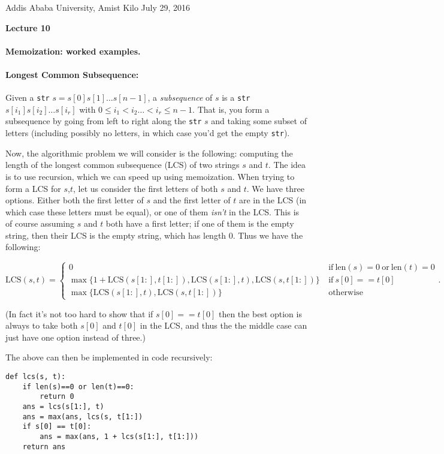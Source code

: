 \documentclass[11pt]{article}
\newlength{\toppush}
\newcommand{\htitle}[2]{\noindent\vspace*{-\toppush}\newline\parbox{6.5in}
 {\large Addis Ababa University, Amist Kilo \hfill #1\newline
\hspace*{\fill}{\bf Algorithms and Programming for High Schoolers} \hspace*{\fill} \newline
\mbox{}\hrulefill\mbox{}}\vspace*{1ex}\mbox{}\newline
\begin{center}{\Large\bf #2}\end{center}}
\begin{document}
\htitle{July 29, 2016}{Lecture 10}

\paragraph{\Large Memoization: worked examples.}

\paragraph{Longest Common Subsequence:}
Given a \texttt{str} $s = s[0]s[1]\ldots s[n-1]$, a {\em subsequence}
of $s$ is a \texttt{str} $s[i_1]s[i_2]\ldots s[i_r]$ with $0 \le i_1 <
i_2 \ldots < i_r \le n-1$. That is, you form a subsequence by going
from left to right along the \texttt{str} $s$ and taking some subset
of letters (including possibly no letters, in which case you'd get the
empty \texttt{str}).

Now, the algorithmic problem we will consider is the following:
computing the length of the longest common subsequence (LCS) of two
strings
$s$ and $t$.  The idea is to use recursion, which we can speed up
using memoization.  When trying to form a LCS
for $s$,$t$, let us consider the first letters of both $s$ and $t$.
We have three options.  Either both the first letter of $s$ and the
first letter of $t$ are in the LCS (in which
case these letters must be equal), or one of them {\em isn't
} in the LCS.  This is of course assuming $s$ and $t$ both have a
first letter; if one of them is the empty string, then their LCS is
the empty string, which has length $0$.  Thus we have the following:

$$\mathrm{LCS}(s,t) =\begin{cases} 0 \ &
  \mathrm{if}\ \mathrm{len}(s)=0\ \mathrm{or}\ \mathrm{len}(t) = 0
\\ \max\{1 + \mathrm{LCS}(s[1:],t[1:]), \mathrm{LCS}(s[1:],t),
\mathrm{LCS}(s,t[1:])\} \ & \mathrm{if}\ s[0] == t[0]\\
\max\{\mathrm{LCS}(s[1:],t),
\mathrm{LCS}(s,t[1:])\}\ &  \mathrm{otherwise} \end{cases} .$$

(In fact it's not too hard to show that if $s[0]==t[0]$ then the best
option is always to take both $s[0]$ and $t[0]$ in the LCS, and thus
the the middle case can just have one option instead of three.)

The above can then be implemented in code recursively:

\begin{verbatim}
def lcs(s, t):
    if len(s)==0 or len(t)==0:
        return 0
    ans = lcs(s[1:], t)
    ans = max(ans, lcs(s, t[1:])
    if s[0] == t[0]:
        ans = max(ans, 1 + lcs(s[1:], t[1:]))
    return ans
\end{verbatim}
\end{document}
